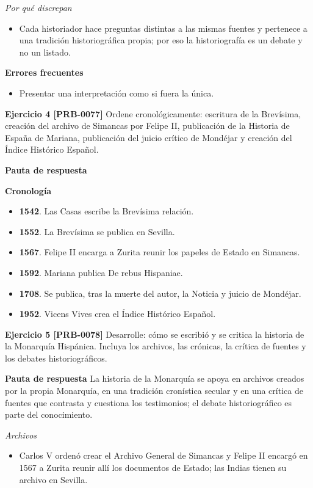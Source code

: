 \documentclass{book}
\begin{document}
\noindent\textit{Por qué discrepan}
\begin{itemize}
\item Cada historiador hace preguntas distintas a las mismas fuentes y pertenece a una tradición historiográfica propia; por eso la historiografía es un debate y no un listado.
\end{itemize}

\noindent\textbf{Errores frecuentes}
\begin{itemize}
\item Presentar una interpretación como si fuera la única.
\end{itemize}

\noindent\textbf{Ejercicio 4 [PRB-0077]}
Ordene cronológicamente: escritura de la Brevísima, creación del archivo de Simancas por Felipe II, publicación de la Historia de España de Mariana, publicación del juicio crítico de Mondéjar y creación del Índice Histórico Español.


\noindent\textbf{Pauta de respuesta}

\noindent\textbf{Cronología}
\begin{itemize}
\item \textbf{1542}. Las Casas escribe la Brevísima relación.
\item \textbf{1552}. La Brevísima se publica en Sevilla.
\item \textbf{1567}. Felipe II encarga a Zurita reunir los papeles de Estado en Simancas.
\item \textbf{1592}. Mariana publica De rebus Hispaniae.
\item \textbf{1708}. Se publica, tras la muerte del autor, la Noticia y juicio de Mondéjar.
\item \textbf{1952}. Vicens Vives crea el Índice Histórico Español.
\end{itemize}

\noindent\textbf{Ejercicio 5 [PRB-0078]}
Desarrolle: cómo se escribió y se critica la historia de la Monarquía Hispánica. Incluya los archivos, las crónicas, la crítica de fuentes y los debates historiográficos.


\noindent\textbf{Pauta de respuesta}
La historia de la Monarquía se apoya en archivos creados por la propia Monarquía, en una tradición cronística secular y en una crítica de fuentes que contrasta y cuestiona los testimonios; el debate historiográfico es parte del conocimiento.


\noindent\textit{Archivos}
\begin{itemize}
\item Carlos V ordenó crear el Archivo General de Simancas y Felipe II encargó en 1567 a Zurita reunir allí los documentos de Estado; las Indias tienen su archivo en Sevilla.
\end{itemize}
\end{document}
